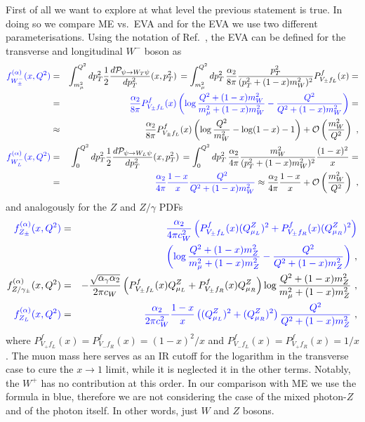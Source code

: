 \documentclass[a4paper,11pt]{article}
\begin{document}
First of all we want to explore at what level the previous statement is true. In doing so we compare  ME vs.~EVA and for the EVA we use two different parameterisations. Using the notation of Ref.~\cite{Garosi:2023bvq}, the EVA can be defined for the  transverse and longitudinal $W^-$ boson as 
\begin{eqnarray}
   { \color{blue} f_{W^-_\pm}^{(\alpha)}(x, Q^2)} &=& \int_{m_\mu^2}^{Q^2} d p_T^2 \frac{1}{2} \frac{d \mathcal{P}_{\psi \to W_T \psi}}{d p_T^2}(x, p_T^2) \, 
    = \int_{m_\mu^2}^{Q^2} d p_T^2 \, \frac{\alpha_2}{8 \pi} \frac{p_T^2}{(p_T^2 + (1-x) m_W^2)^2} P_{V_\pm f_L}^f(x) = \nonumber \\
    &=& { \color{blue}\frac{\alpha_2}{8 \pi} P_{V_\pm f_L}^f(x) \left( \log \frac{Q^2 + (1-x) m_W^2}{m_{\mu}^2 + (1-x) m_W^2} 
    - \frac{Q^2}{Q^2 + (1-x) m_W^2} \right) }= \nonumber \\
    &\approx& \frac{\alpha_2}{8 \pi} P_{V_\pm f_L}^f(x) \left( \log \frac{Q^2}{m_W^2} - \log(1-x) - 1\right) + \mathcal{O}\left( \frac{m_W^2}{Q^2} \right)~, \label{eq:EWA_WT} \\
%
    {\color{blue} f_{W^-_L}^{(\alpha)}(x, Q^2)} &=& \int_{0}^{Q^2} d p_T^2 \frac{1}{2} \frac{d \mathcal{P}_{\psi \to W_L \psi}}{d p_T^2} (x, p_T^2) \, 
    = \int_{0}^{Q^2} d p_T^2 \, \frac{\alpha_2}{4 \pi} \frac{m_W^2}{(p_T^2 + (1-x) m_W^2)^2} \frac{(1-x)^2}{x} = \nonumber \\
    &=& { \color{blue} \frac{\alpha_2}{4 \pi} \frac{1-x}{x}
    \frac{Q^2}{Q^2 + (1-x) m_W^2}}
    \approx \frac{\alpha_2}{4 \pi} \frac{1-x}{x} + \mathcal{O}\left( \frac{m_W^2}{Q^2} \right) ~,\label{eq:EWA_WL}
\end{eqnarray}
and analogously for the $Z$ and $Z/\gamma$ PDFs
\begin{eqnarray}
    {\color{blue}f_{Z_\pm}^{(\alpha)}(x, Q^2)} &=& 
    {\color{blue}\frac{\alpha_2}{4 \pi c_W^2} \left(P_{V_\pm f_L}^f(x) (Q^Z_{\mu_L})^2 + P_{V_\pm f_R}^f(x) (Q^Z_{\mu_R})^2 \right) }\nonumber \\
    && \quad {\color{blue}\left( \log \frac{Q^2 + (1-x) m_Z^2}{m_{\mu}^2 + (1-x) m_Z^2} 
    - \frac{Q^2}{Q^2 + (1-x) m_Z^2} \right)} ~, \label{eq:EWA_ZT} \\
%
    f_{Z/\gamma_\pm}^{(\alpha)}(x, Q^2) &=& 
    -\frac{\sqrt{\alpha_\gamma \alpha_2}}{2 \pi c_W} \left(P_{V_\pm f_L}^f(x) Q^Z_{\mu_L} + P_{V_\pm f_R}^f(x) Q^Z_{\mu_R} \right) \log \frac{Q^2 + (1-x) m_Z^2}{m_{\mu}^2 + (1-x) m_Z^2}  ~, \label{eq:EWA_ZgaT} \\
%
   {\color{blue} f_{Z_L}^{(\alpha)}(x, Q^2)} &=&
    {\color{blue}\frac{\alpha_2}{2 \pi c_W^2} \frac{1-x}{x} \left( (Q^Z_{\mu_L})^2 + (Q^Z_{\mu_R})^2\right) 
    \frac{Q^2}{Q^2 + (1-x) m_Z^2} }~,\label{eq:EWA_ZL}
\end{eqnarray}
where $P_{V_+ f_L}^f(x) = P_{V_- f_R}^f(x) = (1-x)^2 / x$ and $P_{V_- f_L}^f(x) = P_{V_+ f_R}^f(x) = 1 / x$.
The muon mass here serves as an IR cutoff for the logarithm in the transverse case to cure the $x\to 1$ limit, while it is neglected it in the other terms. Notably, the $W^+$ has no contribution at this order.
In our comparison with ME we use the formula in {\color{blue} blue}, therefore we are not considering the case of the mixed photon-$Z$ and of the photon itself.
In other words, just $W$ and $Z$ bosons.
\end{document}
